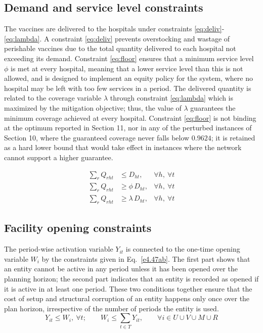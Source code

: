 \documentclass[a4paper]{elsarticle}
\begin{document}
{\subsection{Demand and service level constraints}
The vaccines are delivered to the hospitals under constraints \ref{eq:deliv}-\ref{eq:lambda}. A constraint  \ref{eq:deliv} prevents overstocking and wastage of perishable vaccines due to the total quantity delivered to each hospital not exceeding its demand. Constraint  \ref{eq:floor} ensures that a minimum service level $\phi$ is met at every hospital, meaning that a lower service level than this is not allowed, and is designed to implement an equity policy for the system, where no hospital may be left with too few services in a period. The delivered quantity is related to the coverage variable $\lambda$ through constraint \ref{eq:lambda} which is maximized by the mitigation objective; thus, the value of $\lambda$ guarantees the minimum coverage achieved at every hospital.
Constraint \ref{eq:floor} is not binding at the optimum reported in Section 11, nor in any of the perturbed instances of Section 10, where the guaranteed coverage never falls below $0.9624$; it is retained as a hard lower bound that would take effect in instances where the network cannot support a higher guarantee.

\begin{align}
\sum_{r} Q_{rht} &\le D_{ht}, & \forall h,\ \forall t \label{eq:deliv} \\
\sum_{r} Q_{rht} &\ge \phi\, D_{ht}, & \forall h,\ \forall t \label{eq:floor} \\
\sum_{r} Q_{rht} &\ge \lambda\, D_{ht}, & \forall h,\ \forall t \label{eq:lambda}
\end{align}
\subsection{Facility opening constraints}
\label{subsec:opening}
The period-wise activation variable $Y_{it}$ is connected to the one-time opening variable $W_i$ by the constraints given in Eq.~\ref{e4.47ab}. The first part shows that an entity cannot be active in any period unless it has been opened over the planning horizon; the second part indicates that an entity  is recorded as opened if it is active in at least one period. These two conditions together ensure that the cost of setup and structural corruption of an entity happens only once over the plan horizon, irrespective of the number of periods the entity is used.
\begin{equation}
Y_{it} \leq W_i,\ \forall t; \qquad W_i \leq \sum_{t \in T} Y_{it},
\qquad \forall i \in U \cup V \cup M \cup R
\label{e4.47ab}
\end{equation}
}
\end{document}
